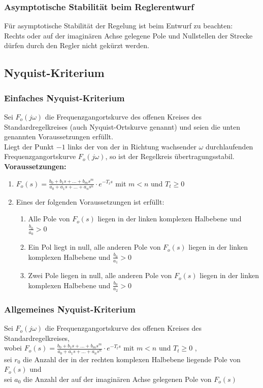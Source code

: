 \documentclass[10pt,a4paper]{article}
\begin{document}
\subsubsection{Asymptotische Stabilität beim Reglerentwurf}
Für asymptotische Stabilität der Regelung ist beim Entwurf zu beachten: \\
Rechts oder auf der imaginären Achse gelegene Pole und Nullstellen der Strecke dürfen durch den Regler nicht gekürzt werden.

\subsection{Nyquist-Kriterium}
\subsubsection{Einfaches Nyquist-Kriterium}
Sei $F_o(j \omega)$ die Frequenzgangortskurve des offenen Kreises des Standardregelkreises (auch Nyquist-Ortskurve genannt) und
seien die unten genannten Voraussetzungen erfüllt. \\
Liegt der Punkt $-1$ links der von der in Richtung wachsender $\omega$ durchlaufenden Frequenzgangortskurve $F_o(j \omega)$, so ist der Regelkreis übertragungsstabil. \\

\textbf{Voraussetzungen:}
\begin{enumerate}
	\item $F_o(s) = \frac{b_0 + b_1s + \dots + b_ms^m}{a_0 + a_1s + \dots + a_ns^n} ⋅ e^{-T_ts}$ mit $m < n$ und $T_t ≥ 0$
	\item Eines der folgenden Voraussetzungen ist erfüllt:
	\begin{enumerate}
		\item Alle Pole von $F_o(s)$ liegen in der linken komplexen Halbebene und $\frac{b_0}{a_0} > 0$
		\item Ein Pol liegt in null, alle anderen Pole von $F_o(s)$ liegen in der linken komplexen Halbebene und $\frac{b_0}{a_1} > 0$
		\item Zwei Pole liegen in null, alle anderen Pole von $F_o(s)$ liegen in der linken komplexen Halbebene und $\frac{b_0}{a_2} > 0$
	\end{enumerate}
\end{enumerate}

\subsubsection{Allgemeines Nyquist-Kriterium}
Sei $F_o(j \omega)$ die Frequenzgangortskurve des offenen Kreises des Standardregelkreises, \\
wobei $F_o(s) = \frac{b_0 + b_1s + \dots + b_ms^m}{a_0 + a_1s + \dots + a_ns^n} ⋅ e^{-T_ts}$ mit $m < n$ und $T_t ≥ 0$ ,\\
sei $r_0$ die Anzahl der in der rechten komplexen Halbebene liegende Pole von $F_o(s)$ und \\
sei $a_0$ die Anzahl der auf der imaginären Achse gelegenen Pole von $F_o(s)$ \\
\end{document}
